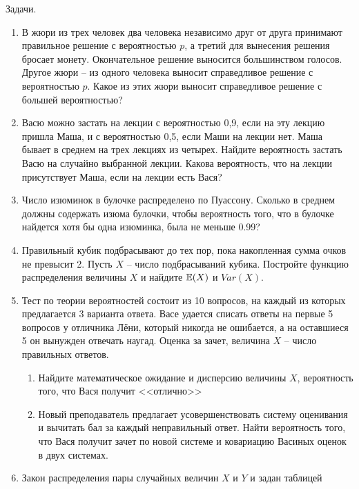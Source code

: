 \documentclass[pdftex,12pt,a4paper]{article}
\begin{document}
Задачи.

\begin{enumerate}
\item В жюри из трех человек два человека независимо друг от друга принимают правильное решение с вероятностью $p$, а третий для вынесения решения бросает монету. Окончательное решение выносится большинством голосов. Другое жюри – из одного человека выносит справедливое решение с вероятностью $p$. Какое из этих жюри выносит справедливое решение с большей вероятностью?

\item Васю можно застать на лекции с вероятностью 0,9, если на эту лекцию пришла Маша, и с вероятностью 0,5, если Маши на лекции нет. Маша бывает в среднем на трех лекциях из четырех. Найдите вероятность застать Васю на случайно выбранной лекции. Какова вероятность, что на лекции присутствует Маша, если на лекции есть Вася?

\item Число изюминок в булочке распределено по Пуассону. Сколько в среднем должны содержать изюма булочки, чтобы вероятность того, что в булочке найдется хотя бы одна изюминка, была не меньше 0.99? 

\item Правильный кубик подбрасывают до тех пор, пока накопленная сумма очков не превысит  2. Пусть $X$ -- число подбрасываний кубика. Постройте функцию распределения величины $X$ и найдите $\mathbb{E}(X)$ и $Var(X)$.

\item Тест по теории вероятностей состоит из 10 вопросов, на каждый из которых предлагается 3 варианта ответа. Васе удается списать ответы на первые 5 вопросов у отличника Лёни, который никогда не ошибается, а на оставшиеся 5 он вынужден отвечать наугад. Оценка за зачет, величина $X$ – число правильных ответов. 
\begin{enumerate}
\item Найдите математическое ожидание и дисперсию величины $X$, вероятность того, что Вася получит <<отлично>>
\item Новый преподаватель предлагает усовершенствовать систему оценивания и вычитать бал за каждый неправильный ответ. Найти вероятность того, что Вася получит зачет по новой системе и ковариацию Васиных оценок в двух системах.
\end{enumerate}

\item Закон распределения пары случайных величин $X$ и $Y$  и  задан таблицей



\end{enumerate}
\end{document}
